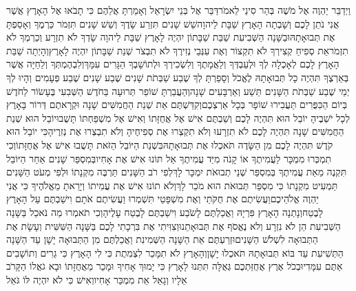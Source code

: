 \documentclass[../main/main.tex]{subfiles}
\begin{document}
\begin{multicols*}{\ncols}
וַיְדַבֵּר יַהְוֶה אֶל מֹשֶׁה בְּהַר סִינַי לֵאמֹר\PreVerseSpace{}דַּבֵּר אֶל בְּנֵי יִשְׂרָאֵל וְאָמַרְתָּ אֲלֵהֶם כִּי תָבֹאוּ אֶל הָאָרֶץ אֲשֶׁר אֲנִי נֹתֵן לָכֶם וְשָׁבְתָה הָאָרֶץ שַׁבָּת לַיהוָה\PreVerseSpace{}שֵׁשׁ שָׁנִים תִּזְרַע שָׂדֶךָ וְשֵׁשׁ שָׁנִים תִּזְמֹר כַּרְמֶךָ וְאָסַפְתָּ אֶת תְּבוּאָתָהּ\PreVerseSpace{}וּבַשָּׁנָה הַשְּׁבִיעִת שַׁבַּת שַׁבָּתוֹן יִהְיֶה לָאָרֶץ שַׁבָּת לַיהוָה שָׂדְךָ לֹא תִזְרָע וְכַרְמְךָ לֹא תִזְמֹר\PreVerseSpace{}אֵת סְפִיחַ קְצִירְךָ לֹא תִקְצוֹר וְאֶת עִנְּבֵי נְזִירֶךָ לֹא תִבְצֹר שְׁנַת שַׁבָּתוֹן יִהְיֶה לָאָרֶץ\PreVerseSpace{}וְהָיְתָה שַׁבַּת הָאָרֶץ לָכֶם לְאָכְלָה לְךָ וּלְעַבְדְּךָ וְלַאֲמָתֶךָ וְלִשְׂכִירְךָ וּלְתוֹשָׁבְךָ הַגָּרִים עִמָּךְ\PreVerseSpace{}וְלִבְהֶמְתְּךָ וְלַחַיָּה אֲשֶׁר בְּאַרְצֶךָ תִּהְיֶה כָל תְּבוּאָתָהּ לֶאֱכֹל \ClosedSection{}וְסָפַרְתָּ לְךָ שֶׁבַע שַׁבְּתֹת שָׁנִים שֶׁבַע שָׁנִים שֶׁבַע פְּעָמִים וְהָיוּ לְךָ יְמֵי שֶׁבַע שַׁבְּתֹת הַשָּׁנִים תֵּשַׁע וְאַרְבָּעִים שָׁנָה\PreVerseSpace{}וְהַעֲבַרְתָּ שׁוֹפַר תְּרוּעָה בַּחֹדֶשׁ הַשְּׁבִעִי בֶּעָשׂוֹר לַחֹדֶשׁ בְּיוֹם הַכִּפֻּרִים תַּעֲבִירוּ שׁוֹפָר בְּכָל אַרְצְכֶם\PreVerseSpace{}וְקִדַּשְׁתֶּם אֵת שְׁנַת הַחֲמִשִּׁים שָׁנָה וּקְרָאתֶם דְּרוֹר בָּאָרֶץ לְכָל יֹשְׁבֶיהָ יוֹבֵל הוּא תִּהְיֶה לָכֶם וְשַׁבְתֶּם אִישׁ אֶל אֲחֻזָּתוֹ וְאִישׁ אֶל מִשְׁפַּחְתּוֹ תָּשֻׁבוּ\PreVerseSpace{}יוֹבֵל הוּא שְׁנַת הַחֲמִשִּׁים שָׁנָה תִּהְיֶה לָכֶם לֹא תִזְרָעוּ וְלֹא תִקְצְרוּ אֶת סְפִיחֶיהָ וְלֹא תִבְצְרוּ אֶת נְזִרֶיהָ\PreVerseSpace{}כִּי יוֹבֵל הוּא קֹדֶשׁ תִּהְיֶה לָכֶם מִן הַשָּׂדֶה תֹּאכְלוּ אֶת תְּבוּאָתָהּ\PreVerseSpace{}בִּשְׁנַת הַיּוֹבֵל הַזֹּאת תָּשֻׁבוּ אִישׁ אֶל אֲחֻזָּתוֹ\PreVerseSpace{}וְכִי תִמְכְּרוּ מִמְכָּר לַעֲמִיתֶךָ אוֹ קָנֹה מִיַּד עֲמִיתֶךָ אַל תּוֹנוּ אִישׁ אֶת אָחִיו\PreVerseSpace{}בְּמִסְפַּר שָׁנִים אַחַר הַיּוֹבֵל תִּקְנֶה מֵאֵת עֲמִיתֶךָ בְּמִסְפַּר שְׁנֵי תְבוּאֹת יִמְכָּר לָךְ\PreVerseSpace{}לְפִי רֹב הַשָּׁנִים תַּרְבֶּה מִקְנָתוֹ וּלְפִי מְעֹט הַשָּׁנִים תַּמְעִיט מִקְנָתוֹ כִּי מִסְפַּר תְּבוּאֹת הוּא מֹכֵר לָךְ\PreVerseSpace{}וְלֹא תוֹנוּ אִישׁ אֶת עֲמִיתוֹ וְיָרֵאתָ מֵאֱלֹהֶיךָ כִּי אֲנִי יַהְוֶה אֱלֹהֵיכֶם\PreVerseSpace{}וַעֲשִׂיתֶם אֶת חֻקֹּתַי וְאֶת מִשְׁפָּטַי תִּשְׁמְרוּ וַעֲשִׂיתֶם אֹתָם וִישַׁבְתֶּם עַל הָאָרֶץ לָבֶטַח\PreVerseSpace{}וְנָתְנָה הָאָרֶץ פִּרְיָהּ וַאֲכַלְתֶּם לָשֹׂבַע וִישַׁבְתֶּם לָבֶטַח עָלֶיהָ\PreVerseSpace{}וְכִי תֹאמְרוּ מַה נֹּאכַל בַּשָּׁנָה הַשְּׁבִיעִת הֵן לֹא נִזְרָע וְלֹא נֶאֱסֹף אֶת תְּבוּאָתֵנוּ\PreVerseSpace{}וְצִוִּיתִי אֶת בִּרְכָתִי לָכֶם בַּשָּׁנָה הַשִּׁשִּׁית וְעָשָׂת אֶת הַתְּבוּאָה לִשְׁלֹשׁ הַשָּׁנִים\PreVerseSpace{}וּזְרַעְתֶּם אֵת הַשָּׁנָה הַשְּׁמִינִת וַאֲכַלְתֶּם מִן הַתְּבוּאָה יָשָׁן עַד הַשָּׁנָה הַתְּשִׁיעִת עַד בּוֹא תְּבוּאָתָהּ תֹּאכְלוּ יָשָׁן\PreVerseSpace{}וְהָאָרֶץ לֹא תִמָּכֵר לִצְמִתֻת כִּי לִי הָאָרֶץ כִּי גֵרִים וְתוֹשָׁבִים אַתֶּם עִמָּדִי\PreVerseSpace{}וּבְכֹל אֶרֶץ אֲחֻזַּתְכֶם גְּאֻלָּה תִּתְּנוּ לָאָרֶץ \ClosedSection{}כִּי יָמוּךְ אָחִיךָ וּמָכַר מֵאֲחֻזָּתוֹ וּבָא גֹאֲלוֹ הַקָּרֹב אֵלָיו וְגָאַל אֵת מִמְכַּר אָחִיו\PreVerseSpace{}וְאִישׁ כִּי לֹא יִהְיֶה לּוֹ גֹּאֵל 
\end{multicols*}
\end{document}
